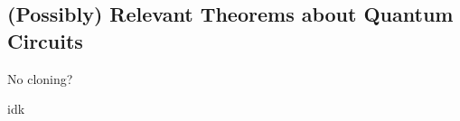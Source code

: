


        







        
        \subsection{(Possibly) Relevant Theorems about Quantum Circuits}

        \begin{theorem}
            No cloning? 
        \end{theorem}

        \begin{definition}
            idk
        \end{definition}

